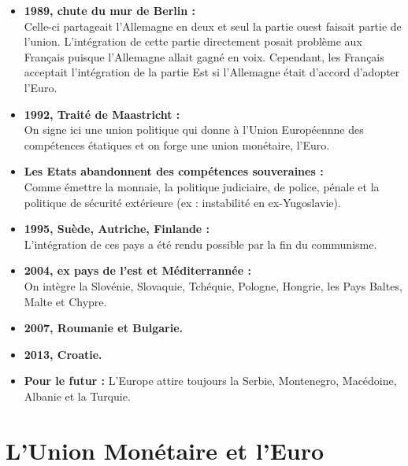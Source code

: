 \begin{itemize}
	\item \textbf{1989, chute du mur de Berlin :} \\
	Celle-ci partageait l'Allemagne en deux et seul la partie ouest faisait partie de l'union. L'intégration de cette partie directement posait problème aux Français puisque l'Allemagne allait gagné en voix. Cependant, les Français acceptait l'intégration de la partie Est si l'Allemagne était d'accord d'adopter l'Euro. 
	
	\item \textbf{1992, Traité de Maastricht :} \\
	On signe ici une union politique qui donne à l'Union Européennne des compétences étatiques et on forge une union monétaire, l'Euro. 
	
	\item \textbf{Les Etats abandonnent des compétences souveraines :} \\
	Comme émettre la monnaie, la politique judiciaire, de police, pénale et la politique de sécurité extérieure (ex : instabilité en ex-Yugoslavie).

	\item \textbf{1995, Suède, Autriche, Finlande :} \\
	L'intégration de ces pays a été rendu possible par la fin du communisme. 
	
	\item \textbf{2004, ex pays de l'est et Méditerrannée :} \\
	On intègre la Slovénie, Slovaquie, Tchéquie, Pologne, Hongrie, les Pays Baltes, Malte et Chypre.
	
	\item \textbf{2007, Roumanie et Bulgarie.}
	
	\item \textbf{2013, Croatie.}
	
	\item \textbf{Pour le futur :}
	L'Europe attire toujours la Serbie, Montenegro, Macédoine, Albanie et la Turquie.
\end{itemize}

\section{L'Union Monétaire et l'Euro}
